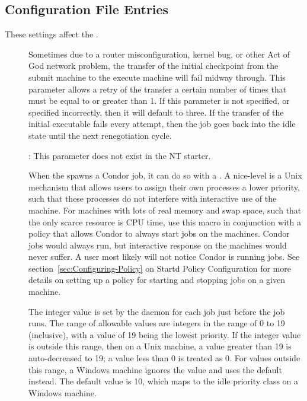 \subsection{\label{sec:Starter-Config-File-Entries}
Configuration File Entries}

These settings affect the .
\begin{description}

\item[] \label{param:ExecTransferAttempts}
  Sometimes due to a router misconfiguration, kernel bug, or other Act
  of God network problem, the transfer of the initial checkpoint from
  the submit machine to the execute machine will fail midway through.
  This parameter allows a retry of the transfer a certain number of times
  that must be equal to or greater than 1. If this parameter is not
  specified, or specified incorrectly, then it will default to three.
  If the transfer of the initial executable fails every attempt, then
  the job goes back into the idle state until the next renegotiation
  cycle.

  \Note: This parameter does not exist in the NT starter.

\item[] \label{param:JobReniceIncrement}
  When the  spawns a Condor job, it can do so with a
  .
  A nice-level is a
  Unix mechanism that allows users to assign their own processes a lower 
  priority, such that these processes do not interfere with interactive
  use of the machine.
  For machines with lots
  of real memory and swap space, such that the only scarce resource is CPU time,
  use this macro in conjunction with a policy that
  allows Condor to always start jobs on the machines. 
  Condor jobs would always run,
  but interactive response on the machines would never suffer.
  A user most likely will not notice Condor is
  running jobs.  See section~\ref{sec:Configuring-Policy} on
  Startd Policy Configuration for more details on setting up a
  policy for starting and stopping jobs on a given machine.

  The integer value is
  set by the  daemon for each job just before the
  job runs.
  The range of allowable values are integers in the range of 0 to 19
  (inclusive),
  with a value of 19 being the lowest priority.  
  If the integer value is outside this range,
  then on a Unix machine, a value greater than 19 is auto-decreased to 19;
  a value less than 0 is treated as 0.
  For values outside this range, a Windows machine ignores the value
  and uses the default instead.
  The default value is 10, which maps to the idle priority class on
  a Windows machine.


\end{description}
